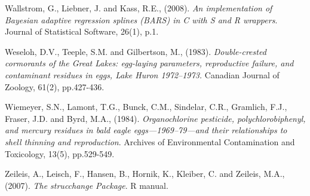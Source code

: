 \documentclass[submit]{smj}
\begin{document}
\begin{thebibliography}{99}
Wallstrom, G., Liebner, J. and Kass, R.E., (2008). 
\textit{An implementation of Bayesian adaptive regression splines (BARS) in C with S and R wrappers}. 
Journal of Statistical Software, 26(1), p.1.

Weseloh, D.V., Teeple, S.M. and Gilbertson, M., (1983). 
\textit{Double-crested cormorants of the Great Lakes: egg-laying parameters, reproductive failure, and contaminant residues in eggs, Lake Huron 1972–1973.} Canadian Journal of Zoology, 61(2), pp.427-436.

Wiemeyer, S.N., Lamont, T.G., Bunck, C.M., Sindelar, C.R., Gramlich, F.J., Fraser, J.D. and Byrd, M.A., (1984). 
\textit{Organochlorine pesticide, polychlorobiphenyl, and mercury residues in bald eagle eggs—1969–79—and their relationships to shell thinning and reproduction}.
Archives of Environmental Contamination and Toxicology, 13(5), pp.529-549.

Zeileis, A., Leisch, F., Hansen, B., Hornik, K., Kleiber, C. and Zeileis, M.A., (2007). 
\textit{The strucchange Package}.
R manual.


\end{thebibliography}
\end{document}
